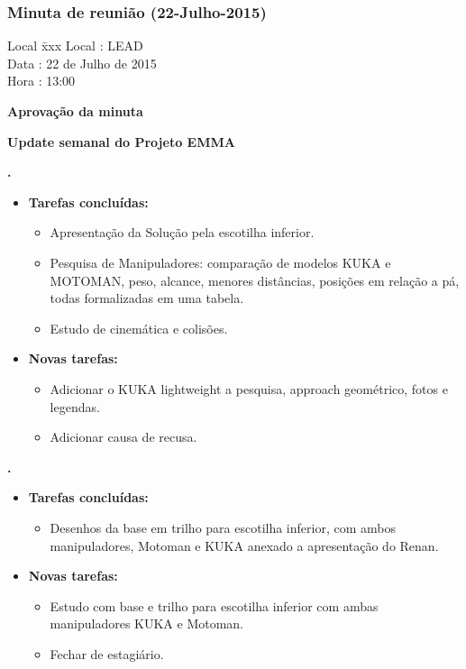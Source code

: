 \subsubsection{Minuta de reunião (22-Julho-2015)}

\begin{tabbing}
  Local \= xxx \kill
  Local \> : LEAD \\
  Data  \> : 22 de Julho de 2015 \\
  Hora  \> : 13:00
\end{tabbing}


\textbf{Aprovação da minuta}

\textbf{Update semanal do Projeto EMMA}

  
\textbf{\renan.} 
	\begin{itemize}
		\item \textbf{Tarefas concluídas:}
			\begin{itemize}    
				\item Apresentação da Solução pela escotilha inferior.
 				\item Pesquisa de Manipuladores: comparação de modelos KUKA e
 				MOTOMAN, peso, alcance, menores distâncias, posições
 				em relação a pá, todas formalizadas em uma tabela.
 				\item Estudo de cinemática e colisões.
			\end{itemize}
		
		\item \textbf{Novas tarefas:}
			\begin{itemize} 
				\item Adicionar o KUKA lightweight a pesquisa, approach geométrico, fotos e
				legendas. 
				\item Adicionar causa de recusa.
			\end{itemize}
	\end{itemize}

			
\textbf{.} 
	\begin{itemize}
		\item \textbf{Tarefas concluídas:}
			\begin{itemize}    
				\item Desenhos da base em trilho para escotilha inferior, com ambos
				manipuladores, Motoman e KUKA anexado a apresentação do Renan.
			\end{itemize}
		
		\item \textbf{Novas tarefas:}
			\begin{itemize} 
				\item Estudo com base e trilho para escotilha inferior com ambas
				manipuladores KUKA e Motoman.
				\item Fechar de estagiário.
			\end{itemize}
	\end{itemize}
	
